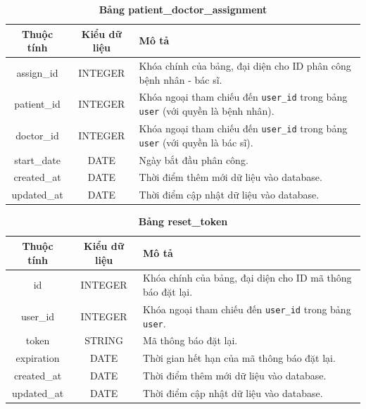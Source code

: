 \begin{table}[H]
  \caption{\bfseries \fontsize{12pt}{0pt}\selectfont Bảng patient\_doctor\_assignment}
  \centering
  \begin{tabularx}{0.9\textwidth}{|c|c|X|}
    \hline
    \textbf{Thuộc tính} & \textbf{Kiểu dữ liệu} & \textbf{Mô tả} \\
    \hline
    assign\_id & INTEGER & Khóa chính của bảng, đại diện cho ID phân công bệnh nhân - bác sĩ. \\
    \hline
    patient\_id & INTEGER & Khóa ngoại tham chiếu đến \texttt{user\_id} trong bảng \texttt{user} (với quyền là bệnh nhân). \\
    \hline
    doctor\_id & INTEGER & Khóa ngoại tham chiếu đến \texttt{user\_id} trong bảng \texttt{user} (với quyền là bác sĩ). \\
    \hline
    start\_date & DATE & Ngày bắt đầu phân công. \\
    \hline
    created\_at & DATE & Thời điểm thêm mới dữ liệu vào database. \\
    \hline
    updated\_at & DATE & Thời điểm cập nhật dữ liệu vào database. \\
    \hline
  \end{tabularx}
\end{table}

\begin{table}[H]
  \caption{\bfseries \fontsize{12pt}{0pt}\selectfont Bảng reset\_token}
  \centering
  \begin{tabularx}{0.9\textwidth}{|c|c|X|}
    \hline
    \textbf{Thuộc tính} & \textbf{Kiểu dữ liệu} & \textbf{Mô tả} \\
    \hline
    id & INTEGER & Khóa chính của bảng, đại diện cho ID mã thông báo đặt lại. \\
    \hline
    user\_id & INTEGER & Khóa ngoại tham chiếu đến \texttt{user\_id} trong bảng \texttt{user}. \\
    \hline
    token & STRING & Mã thông báo đặt lại. \\
    \hline
    expiration & DATE & Thời gian hết hạn của mã thông báo đặt lại. \\
    \hline
    created\_at & DATE & Thời điểm thêm mới dữ liệu vào database. \\
    \hline
    updated\_at & DATE & Thời điểm cập nhật dữ liệu vào database. \\
    \hline
  \end{tabularx}
\end{table}



